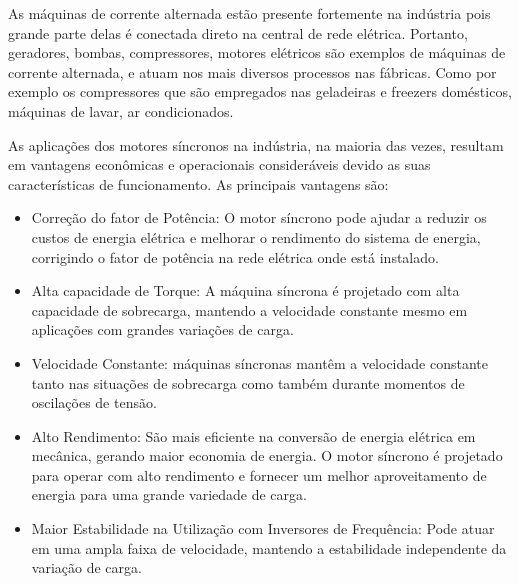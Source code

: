 As máquinas de corrente alternada estão presente fortemente na indústria pois grande parte delas é conectada direto na central de rede elétrica. Portanto, geradores, bombas, compressores, motores elétricos são exemplos de máquinas de corrente alternada, e atuam nos mais diversos processos  nas  fábricas. Como por exemplo os compressores que são empregados nas geladeiras e freezers domésticos, máquinas de lavar, ar condicionados. 

As aplicações dos motores síncronos na indústria, na maioria das vezes, resultam em vantagens econômicas e operacionais consideráveis devido as suas características de funcionamento. As principais vantagens são:

\begin{itemize}
\item Correção do fator de Potência: O motor síncrono pode ajudar a reduzir os custos de energia elétrica e melhorar o rendimento do sistema de energia, corrigindo o fator de potência na rede elétrica onde está instalado.

\item Alta capacidade de Torque:  A máquina síncrona é projetado com alta capacidade de sobrecarga, mantendo a velocidade constante mesmo em aplicações com grandes variações de carga.

\item Velocidade Constante: máquinas síncronas mantêm a velocidade constante tanto nas situações de sobrecarga como também durante momentos de oscilações de tensão.

\item Alto Rendimento: São mais eficiente na conversão de energia elétrica em mecânica, gerando maior economia de energia. O motor síncrono é projetado para operar com alto rendimento e fornecer um melhor aproveitamento de energia para uma
grande variedade de carga.

\item Maior Estabilidade na Utilização com Inversores de Frequência: Pode atuar em uma ampla faixa de velocidade, mantendo a estabilidade independente da variação de carga.

\end{itemize}

